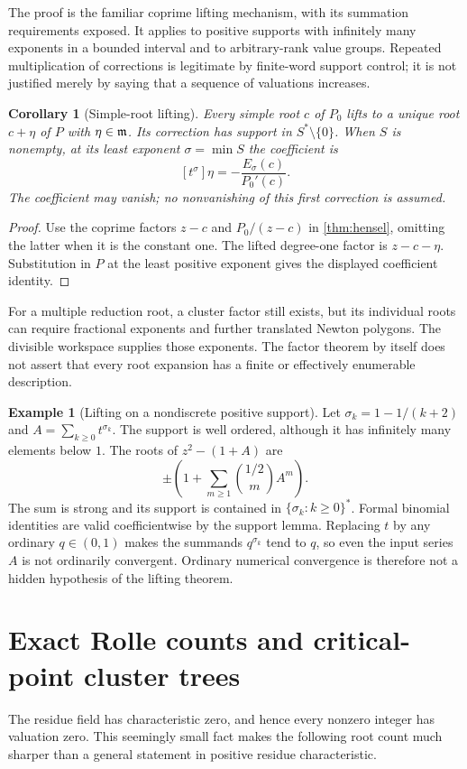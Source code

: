 \documentclass[11pt,letterpaper,oneside]{article}
\numberwithin{equation}{section}
\newtheorem{corollary}[theorem]{Corollary}
\theoremstyle{definition}
\newtheorem{example}[theorem]{Example}
\theoremstyle{remark}\newtheorem{remark}[theorem]{Remark}
\begin{document}
The proof is the familiar coprime lifting mechanism, with its summation
requirements exposed. It applies to positive supports with infinitely many
exponents in a bounded interval and to arbitrary-rank value groups.
Repeated multiplication of corrections is legitimate by finite-word support
control; it is not justified merely by saying that a sequence of valuations
increases.

\begin{corollary}[Simple-root lifting]\label{cor:simplelift}
Every simple root $c$ of $P_0$ lifts to a unique root $c+\eta$ of $P$ with
$\eta\in\mathfrak m$. Its correction has support in $S^*\setminus\{0\}$.
When $S$ is nonempty, at its least exponent $\sigma=\min S$ the coefficient is
\[
 [t^\sigma]\eta=-\frac{E_\sigma(c)}{P_0'(c)}.
\]
The coefficient may vanish; no nonvanishing of this first correction is
assumed.
\end{corollary}
\begin{proof}
Use the coprime factors $z-c$ and $P_0/(z-c)$ in \cref{thm:hensel},
omitting the latter when it is the constant one.
The lifted degree-one factor is $z-c-\eta$. Substitution in $P$ at the
least positive exponent gives the displayed coefficient identity.
\end{proof}
For a multiple reduction root, a cluster factor still exists, but its
individual roots can require fractional exponents and further translated
Newton polygons. The divisible workspace supplies those exponents. The
factor theorem by itself does not assert that every root expansion has a
finite or effectively enumerable description.

\begin{example}[Lifting on a nondiscrete positive support]\label{ex:nondiscrete}
Let $\sigma_k=1-1/(k+2)$ and $A=\sum_{k\geq0}t^{\sigma_k}$.
The support is well ordered, although it has infinitely many elements
below $1$. The roots of $z^2-(1+A)$ are
\[
 \pm\left(1+\sum_{m\geq1}\binom{1/2}{m}A^m\right).
\]
The sum is strong and its support is contained in
$\{\sigma_k:k\geq0\}^*$. Formal binomial identities are valid
coefficientwise by the support lemma. Replacing $t$ by any ordinary
$q\in(0,1)$ makes the summands $q^{\sigma_k}$ tend to $q$, so even the
input series $A$ is not ordinarily convergent. Ordinary numerical
convergence is therefore not a hidden hypothesis of the lifting theorem.
\end{example}

\section{Exact Rolle counts and critical-point cluster trees}\label{sec:critical}
The residue field has characteristic zero, and hence every nonzero integer
has valuation zero. This seemingly small fact makes the following root
count much sharper than a general statement in positive residue
characteristic.
\end{document}
